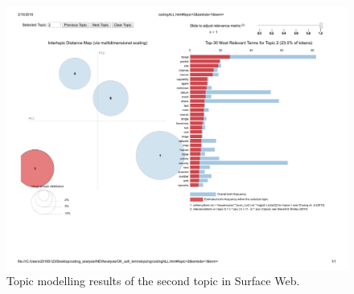 
\begin{figure}[h!]
\begin{center}
\includegraphics[scale=0.5]{./img/codingALL_topic2.pdf}
\end{center}
\caption{Topic modelling results of the second topic in Surface Web.}
\label{fig:topicmodelling_2}
\end{figure}


